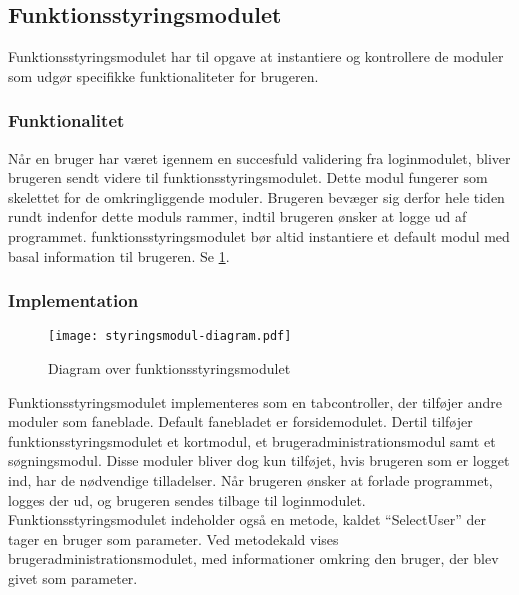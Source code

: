 \subsection{Funktionsstyringsmodulet}
\label{sub:styringsmodul}

Funktionsstyringsmodulet har til opgave at instantiere og kontrollere de moduler som udgør specifikke funktionaliteter for brugeren.

\subsubsection{Funktionalitet}
\label{ssub:hovedmodul_funktionalitet}

Når en bruger har været igennem en succesfuld validering fra loginmodulet, bliver brugeren sendt videre til funktionsstyringsmodulet. Dette modul fungerer som skelettet for de omkringliggende moduler. Brugeren bevæger sig derfor hele tiden rundt indenfor dette moduls rammer, indtil brugeren ønsker at logge ud af programmet. funktionsstyringsmodulet bør altid instantiere et default modul med basal information til brugeren. Se \cref{fig:styring}.

\subsubsection{Implementation}
\label{ssub:hovedmodul_implementation}

\begin{figure}
  \centering
  \texttt{[image: styringsmodul-diagram.pdf]}
  \caption{Diagram over funktionsstyringsmodulet} \label{fig:styring}
\end{figure}

Funktionsstyringsmodulet implementeres som en tabcontroller, der tilføjer andre moduler som faneblade. Default fanebladet er forsidemodulet. Dertil tilføjer funktionsstyringsmodulet et kortmodul, et brugeradministrationsmodul samt et søgningsmodul. Disse moduler bliver dog kun tilføjet, hvis brugeren som er logget ind, har de nødvendige tilladelser. Når brugeren ønsker at forlade programmet, logges der ud, og brugeren sendes tilbage til loginmodulet. Funktionsstyringsmodulet indeholder også en metode, kaldet \enquote{SelectUser} der tager en bruger som parameter. Ved metodekald vises brugeradministrationsmodulet, med informationer omkring den bruger, der blev givet som parameter. 

